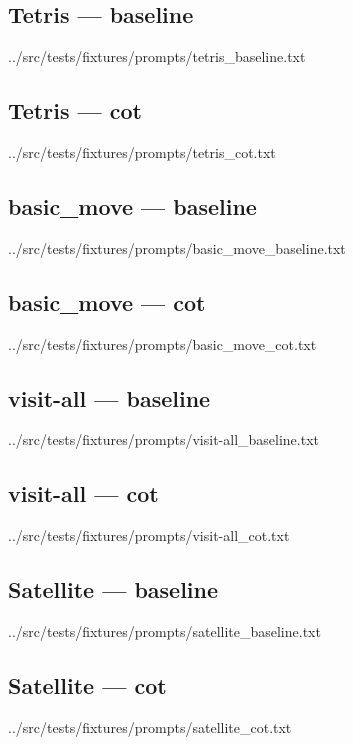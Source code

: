 \subsection{Tetris --- baseline}

    {../src/tests/fixtures/prompts/tetris_baseline.txt}

\subsection{Tetris --- cot}

    {../src/tests/fixtures/prompts/tetris_cot.txt}

\subsection{basic\_move --- baseline}

    {../src/tests/fixtures/prompts/basic_move_baseline.txt}

\subsection{basic\_move --- cot}

    {../src/tests/fixtures/prompts/basic_move_cot.txt}

\subsection{visit-all --- baseline}

    {../src/tests/fixtures/prompts/visit-all_baseline.txt}

\subsection{visit-all --- cot}

    {../src/tests/fixtures/prompts/visit-all_cot.txt}

\subsection{Satellite --- baseline}

    {../src/tests/fixtures/prompts/satellite_baseline.txt}

\subsection{Satellite --- cot}

    {../src/tests/fixtures/prompts/satellite_cot.txt}
